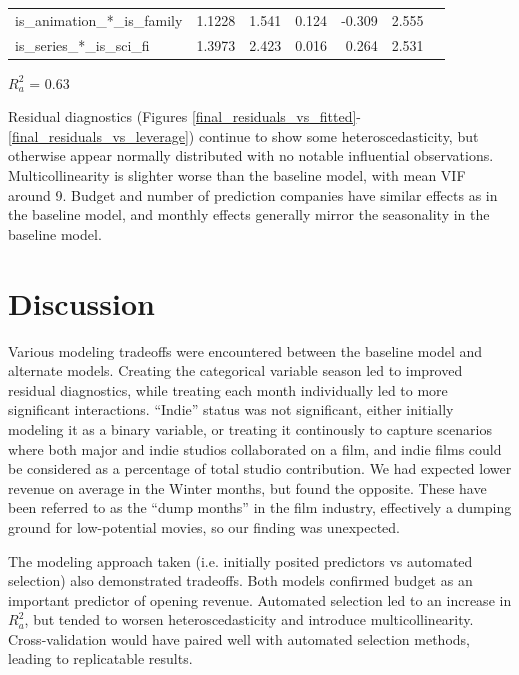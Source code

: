 \documentclass[10pt]{article}
\begin{document}
\begin{table}[H]
\begin{threeparttable}
\begin{tabular}{lrrrrrr}
		is\_animation\_*\_is\_family &       1.1228       &     1.541  &         0.124        &       -0.309    &        2.555     \\
		is\_series\_*\_is\_sci\_fi   &       1.3973       &     2.423  &         0.016        &        0.264    &        2.531     \\
		\bottomrule
		\end{tabular}
    \begin{tablenotes}
      \scriptsize
      \item $R^2_a$ = 0.63
    \end{tablenotes}  
  \end{threeparttable}    
\end{table}

Residual diagnostics (Figures \ref{final_residuals_vs_fitted}-\ref{final_residuals_vs_leverage}) continue to show some heteroscedasticity, but otherwise appear normally distributed with no notable influential observations. Multicollinearity is slighter worse than the baseline model, with mean VIF around 9. Budget and number of prediction companies have similar effects as in the baseline model, and monthly effects generally mirror the seasonality in the baseline model. 

\section{Discussion}
Various modeling tradeoffs were encountered between the baseline model and alternate models. Creating the categorical variable season led to improved residual diagnostics, while treating each month individually led to more significant interactions. “Indie” status was not significant, either initially modeling it as a binary variable, or treating it continously to capture scenarios where both major and indie studios collaborated on a film, and indie films could be considered as a percentage of total studio contribution. We had expected lower revenue on average in the Winter months, but found the opposite. These have been referred to as the “dump months” in the film industry, effectively a dumping ground for low-potential movies, so our finding was unexpected.

The modeling approach taken (i.e. initially posited predictors vs automated selection) also demonstrated tradeoffs. Both models confirmed budget as an important predictor of opening revenue.
Automated selection led to an increase in $R^2_a$, but tended to worsen heteroscedasticity and introduce multicollinearity. Cross-validation would have paired well with automated selection methods, leading to replicatable results. 
\end{document}
